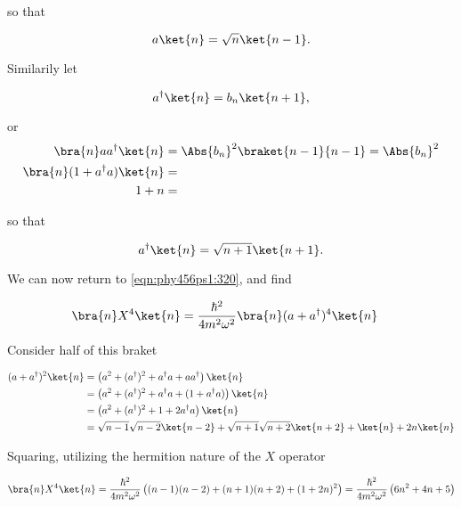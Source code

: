 so that 

\begin{equation}\label{eqn:phy456ps1:380}
a \ket{n} = \sqrt{n} \ket{n - 1}.
\end{equation}

Similarily let

\begin{equation}\label{eqn:phy456ps1:400}
a^\dagger \ket{n} = b_n \ket{n + 1},
\end{equation}

or
\begin{align*}
\bra{n} a a^\dagger \ket{n} &= \Abs{b_n}^2 \braket{n - 1}{n-1} = \Abs{b_n}^2 \\
\bra{n} (1 + a^\dagger a) \ket{n} &= \\
1 + n &=
\end{align*}

so that 

\begin{equation}\label{eqn:phy456ps1:440}
a^\dagger \ket{n} = \sqrt{n+1} \ket{n + 1}.
\end{equation}

We can now return to \ref{eqn:phy456ps1:320}, and find

\begin{align*}
\bra{n} X^4 \ket{n}
&=
\frac{\hbar^2}{4 m^2 \omega^2} \bra{n} (a + a^\dagger)^4 \ket{n}
\end{align*}

Consider half of this braket

\begin{align*}
(a + a^\dagger)^2 \ket{n}
&=
\left( a^2 + (a^\dagger)^2 + a^\dagger a + a a^\dagger \right) \ket{n} \\
&=
\left( a^2 + (a^\dagger)^2 + a^\dagger a + (1 + a^\dagger a) \right) \ket{n} \\
&=
\left( a^2 + (a^\dagger)^2 + 1 + 2 a^\dagger a \right) \ket{n} \\
&=
\sqrt{n-1}\sqrt{n-2} \ket{n-2}
+ 
\sqrt{n+1}\sqrt{n+2} \ket{n + 2}
+ 
\ket{n}
+  2 n \ket{n}
\end{align*}

Squaring, utilizing the hermition nature of the $X$ operator %

\begin{equation}\label{eqn:phy456ps1:500}
\bra{n} X^4 \ket{n}
=
\frac{\hbar^2}{4 m^2 \omega^2} 
\left(
(n-1)(n-2) + (n+1)(n+2) + (1 + 2n)^2
\right)
=
\frac{\hbar^2}{4 m^2 \omega^2} 
\left( 6 n^2 + 4 n + 5 \right)
\end{equation}

